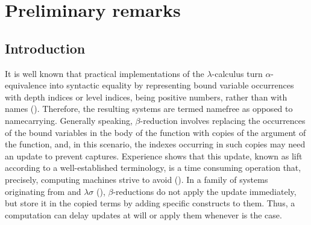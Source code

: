 \documentclass[submission,copyright,creativecommons]{eptcs}
\begin{document}
\newcommand{\renlab}{\renewcommand{\labelitemi}{$-$}}%
\newcommand{\listbegin}{\vspace{-1ex}\begin{itemize}\renlab}
\newcommand{\listend}{\end{itemize}\vspace{-1ex}}





\section{Preliminary remarks}
\label{SecPre}

\subsection{Introduction}
\label{SecInt}

It is well known that practical implementations of the $\lambda$-calculus turn $\alpha$-equivalence into syntactic equality by representing bound variable occurrences with depth indices or level indices, being positive numbers, rather than with names (\cite{deB72}). Therefore, the resulting systems are termed namefree as opposed to namecarrying.
Generally speaking, $\beta$-reduction involves replacing the occurrences of the bound variables in the body of the function with copies of the argument of the function, and, in this scenario, the indexes occurring in such copies may need an update to prevent captures.
Experience shows that this update, known as lift according to a well-established terminology, is a time consuming operation \cite[Appendix A2]{Gui09} that, precisely, computing machines strive to avoid (\cite{Klu05}). In a family of systems originating from \cite{deB78b} and $\lambda\sigma$ (\cite{Aba91}), $\beta$-reductions do not apply the update immediately, but store it in the copied terms by adding specific constructs to them. Thus, a computation can delay updates at will or apply them whenever is the case.



\end{document}
